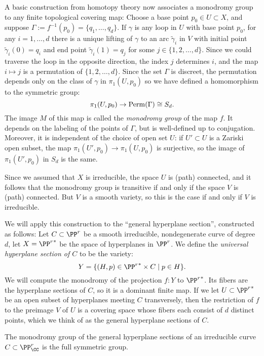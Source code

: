 A basic construction from homotopy theory now associates a monodromy group to any finite topological covering map: Choose a base point $p_0 \in U \subset X$, and suppose $\Gamma := f^{-1}(p_0)  = \{q_1,\dots,q_d\}$. If $\gamma$ is any loop in $U$ with base point $p_0$, for any $i = 1, \dots, d$ there is a unique lifting of $\gamma$ to an arc $\tilde \gamma_i$ in $V$ with initial point $\tilde \gamma_i(0) = q_i$ and end point $\tilde \gamma_i(1) = q_j$ for some $j \in \{1,2,\dots,d\}$. Since we could traverse the loop in the opposite direction, the index $j$ determines $i$, and the map $i\mapsto j$ is a permutation of $\{1,2,\dots,d\}$. 
Since the set $\Gamma$ is discreet, the permutation depends only on the class of $\gamma$ in $\pi_1(U,p_0)$ so we have defined a homomorphism to the symmetric group:
$$
\pi_1(U,p_0)  \to {\rm Perm}(\Gamma) \cong S_d.
$$
The image $M$ of this map is called the \emph{monodromy group} of the map $f$. It depends on the labeling of the points of $\Gamma$, but is well-defined  up to conjugation. Moreover, it is independent of the choice of open set $U$: if $U' \subset U$ is a Zariski open subset, the map $\pi_1(U', p_0) \to \pi_1(U,p_0)$ is surjective,  so the image of $\pi_1(U', p_0)$ in $S_d$ is the same.

Since we assumed that $X$ is irreducible, the space $U$ is (path) connected, and it follows that the monodromy group is transitive if and only if the space $V$ is (path) connected. But $V$ is a smooth
variety, so this is the case if and only if $V$ is irreducible.

We will apply this construction to the ``general hyperplane section'', constructed as follows:
Let $C \subset \PP^r$ be a smooth irreducible, nondegenerate curve of degree $d$, let $X = {\PP^r}^*$ be the space of hyperplanes in $\PP^r$. We define the \emph{universal hyperplane section of $C$} to be the variety:
$$
Y = \{ (H, p) \in {\PP^r}^* \times C \mid p \in H \}.
$$
We will compute the monodromy of the projection $f: Y$ to ${\PP^r}^*$. Its fibers are the hyperplane
sections of $C$, so it is a dominant finite map. If we let $U\subset {\PP^r}^*$ be an open subset of hyperplanes
meeting $C$ transversely, then the restriction of $f$ to the preimage $V$ of $U$ is a covering space
whose fibers each consist of $d$ distinct points, which we think of as the general hyperplane sections
of $C$.

\begin{theorem}\label{uniform position lemma}
The monodromy group of the general hyperplane sections of an irreducible curve $C \subset \PP^r_\CC$ is the full symmetric group.
\end{theorem}

